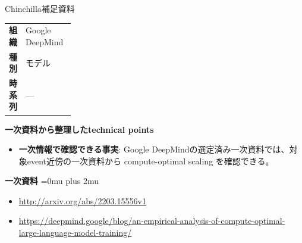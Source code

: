 \begin{technicalnote}{Chinchilla}{補足資料}
\begingroup
\begin{tabularx}{\linewidth}{@{}>{\bfseries}p{0.22\linewidth}X@{}}
組織 & Google DeepMind \\
種別 & モデル \\
時系列 & — \\
\end{tabularx}
\smallskip
{\bfseries 一次資料から整理したtechnical points}
\begin{itemize}[leftmargin=1.5em,itemsep=0.35em]
\item \textbf{一次情報で確認できる事実}: Google DeepMindの選定済み一次資料では、対象event近傍の一次資料から compute-optimal scaling を確認できる。
\end{itemize}
\begin{minipage}{\linewidth}
\begin{samepage}
{\bfseries 一次資料}
\begingroup\sloppy
\Urlmuskip=0mu plus 2mu\relax
\begin{itemize}[leftmargin=1.5em,itemsep=0.25em]
\item {\scriptsize\url{http://arxiv.org/abs/2203.15556v1}}
\item {\scriptsize\url{https://deepmind.google/blog/an-empirical-analysis-of-compute-optimal-large-language-model-training/}}
\end{itemize}
\endgroup
\end{samepage}
\end{minipage}
\endgroup
\end{technicalnote}
\medskip

